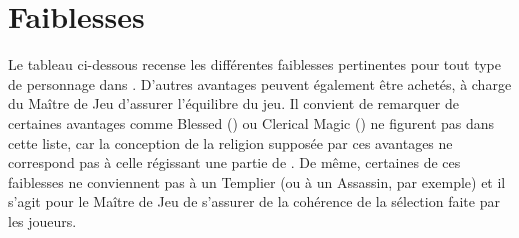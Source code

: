 \section{Faiblesses}\label{sec:faiblesses}
Le tableau ci-dessous recense les différentes faiblesses pertinentes pour tout
type de personnage dans \gmc. D'autres avantages peuvent également être achetés,
à charge du Maître de Jeu d'assurer l'équilibre du jeu. Il convient de remarquer
de certaines avantages comme Blessed (\cite[p.93]{R}) ou Clerical Magic
(\cite[p.35]{CI}) ne figurent pas dans cette liste, car la conception de la
religion supposée par ces avantages ne correspond pas à celle régissant une
partie de \gmc. De même, certaines de ces faiblesses ne conviennent pas à un
Templier (ou à un Assassin, par exemple) et il s'agit pour le Maître de Jeu de
s'assurer de la cohérence de la sélection faite par les joueurs.

